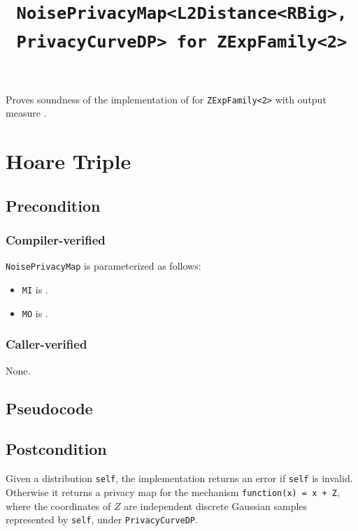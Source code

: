 \documentclass{article}
\title{\texttt{NoisePrivacyMap<L2Distance<RBig>, PrivacyCurveDP> for ZExpFamily<2>}}
\author{\MichaelShoemateAuthor}
\date{}
\begin{document}
\maketitle

\contrib
Proves soundness of the implementation of
 for
\texttt{ZExpFamily<2>} with output measure
.

\section{Hoare Triple}
\subsection*{Precondition}
\subsubsection*{Compiler-verified}
\texttt{NoisePrivacyMap} is parameterized as follows:
\begin{itemize}
    \item \texttt{MI} is .
    \item \texttt{MO} is .
\end{itemize}

\subsubsection*{Caller-verified}
None.

\subsection*{Pseudocode}


\subsection*{Postcondition}
\begin{theorem}
Given a distribution \texttt{self}, the implementation returns an error if
\texttt{self} is invalid. Otherwise it returns a privacy map for the mechanism
\texttt{function(x) = x + Z}, where the coordinates of $Z$ are independent
discrete Gaussian samples represented by \texttt{self}, under
\texttt{PrivacyCurveDP}.
\end{theorem}
\end{document}
